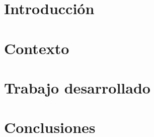 \documentclass[12pt, a4paper, titlepage, twoside, openright, spanish]{report}
\makeatletter
\renewcommand{\baselinestretch}{1.5}
\def\cleardoublepage{\clearpage\if@twoside \ifodd\c@page\else
	\hbox{}
	\vspace*{\fill}
	\begin{center}
		\thepage
	\end{center}
	\thispagestyle{empty}
	\newpage
	\if@twocolumn\hbox{}\newpage\fi\fi\fi}
\makeatother
\begin{document}
	
	\cleardoublepage
	
	
	\cleardoublepage
	
	
	\cleardoublepage
	
	
	\cleardoublepage
	
	\def\baselinestretch{1}\selectfont
	
	\def\baselinestretch{1.5}\selectfont
	\cleardoublepage
	
	
	\cleardoublepage
	
	
	\cleardoublepage
	
	\tableofcontents
	\cleardoublepage
	
	\pagestyle{fancy}
	\renewcommand{\chaptermark}[1]{\markboth{
			{\thechapter.\ #1}}{}}
	\renewcommand{\sectionmark}[1]{\markright{
			{\thesection\  #1}}{}}
	
	\hypertarget{introduccion}{\chapter{Introducción}}
	\label{introduction}
	
	\cleardoublepage
	
	\hypertarget{background}{\chapter{Contexto}}
	\label{background}
	
	\cleardoublepage

	\hypertarget{mainwork}{\chapter{Trabajo desarrollado}}
	\label{mainwork}
	
	\cleardoublepage
	
	
	\hypertarget{conclusions}{\chapter{Conclusiones}}
	\label{conclusions}
	
	\cleardoublepage
	
\end{document}
